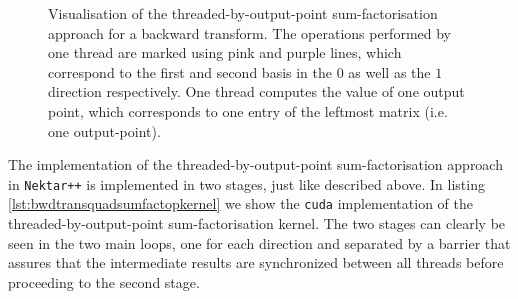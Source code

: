 \begin{figure}[h!]
\caption{Visualisation of the threaded-by-output-point sum-factorisation approach for a backward transform. The operations performed by one thread are marked using pink and purple lines, which correspond to the first and second basis in the $0$ as well as the $1$ direction respectively. One thread computes the value of one output point, which corresponds to one entry of the leftmost matrix (i.e. one output-point).}
\label{fig:sumfactop_bwdtrans_viz}
\end{figure}

The implementation of the threaded-by-output-point sum-factorisation approach in \texttt{Nektar++} is implemented in two stages, just like described above.
In listing \ref{lst:bwdtransquadsumfactopkernel} we show the \texttt{cuda} implementation of the threaded-by-output-point sum-factorisation kernel.
The two stages can clearly be seen in the two main loops, one for each direction and separated by a barrier that assures that the intermediate results are synchronized between all threads before proceeding to the second stage.

